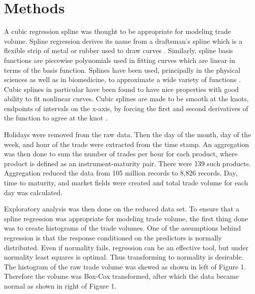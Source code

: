 \documentclass[12pt]{article}
\begin{document}
\section*{Methods}
A cubic regression spline was thought to be appropriate for modeling trade volume. Spline regression derives its name from a draftsman’s spline which is a flexible strip of metal or rubber used to draw curves \cite{harrell2015regression}. Similarly, spline basis functions are piecewise polynomials used in fitting curves which are linear in terms of the basis function. Splines have been used, principally in the physical sciences as well as in biomedicine, to approximate a wide variety of functions \cite{harrell2015regression}. Cubic splines in particular have been found to have nice properties with good ability to fit nonlinear curves. Cubic splines are made to be smooth at the knots, endpoints of intervals on the x-axis, by forcing the first and second derivatives of the function to agree at the knot \cite{harrell2015regression}.  

Holidays were removed from the raw data. Then the day of the month, day of the week, and hour of the trade were extracted from the time stamp. An aggregation was then done to sum the number of trades per hour for each product, where product is defined as an instrument-maturity pair. There were 139 such products. Aggregation reduced the data from 105 million records to 8,826 records. Day, time to maturity, and market fields were created and total trade volume for each day was calculated.

Exploratory analysis was then done on the reduced data set. To ensure that a spline regression was appropriate for modeling trade volume, the first thing done was to create histograms of the trade volumes. One of the assumptions behind regression is that the response conditioned on the predictors is normally distributed. Even if normality fails, regression can be an effective tool, but under normality least squares is optimal. Thus transforming to normality is desirable. The histogram of the raw trade volume was skewed as shown in left of Figure 1. Therefore the volume was Box-Cox transformed, after which the data became normal as shown in right of Figure 1.
\end{document}
